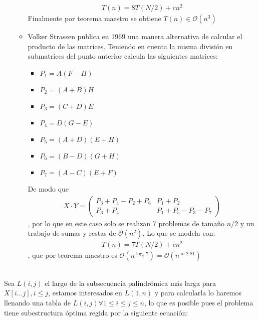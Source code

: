 \documentclass[dcc,uchile]{fcfmcourse}
\begin{document}
\begin{problems}
\begin{enumerate}[a)]
\begin{itemize}
        \begin{align*}
            T(n) = 8T(N/2) + cn^2
        \end{align*}
        Finalmente por teorema maestro se obtiene $T(n) \in \mathcal{O}(n^3)$
        \item Volker Strassen publica en 1969 una manera alternativa de calcular el producto de las matrices. Teniendo en cuenta la misma división en submatrices del punto anterior calcula las siguientes matrices:
        \begin{itemize}
            \item $P_{1} = A(F - H)$
            \item $P_{2} = (A + B)H$
            \item $P_{3} = (C + D)E$
            \item $P_{4} = D(G - E)$
            \item $P_{5} = (A + D)(E + H)$
            \item $P_{6} = (B - D)(G + H)$
            \item $P_{7} = (A - C)(E + F)$
        \end{itemize}
        De modo que
        \begin{align*}
         X\cdot Y = \begin{pmatrix}
           P_{3} + P_{4} - P_{2} + P_{6} & P_{1} + P_{2} \\
            P_{3} + P_{4} & P_{1} + P_{5} - P_{3} - P_{7}
         \end{pmatrix}
         \end{align*}
         , por lo que en este caso solo se realizan 7 problemas de tamaño $n/2$ y un trabajo de sumas y restas de $\mathcal{O}(n^2)$. Lo que se modela con:
         \begin{align*}
            T(n) = 7T(N/2) + cn^2
         \end{align*}
         , que por teorema maestro es $\mathcal{O}(n^{\log_{2}7}) = \mathcal{O}(n^{\approx 2.81})$
        \end{itemize}
 \end{enumerate}
\\
Sea $L(i,j)$ el largo de la subsecuencia palindrómica más larga para $X[i\ldots j], i\le j$, estamos interesados en $L(1,n)$ y para calcularla lo haremos llenando una tabla de $L(i,j) \forall 1\le i\le j \le n$, lo que es posible pues el problema tiene subestructura óptima regida por la siguiente ecuación:
\begin{align*}

\end{align*}
\end{problems}
\end{document}
